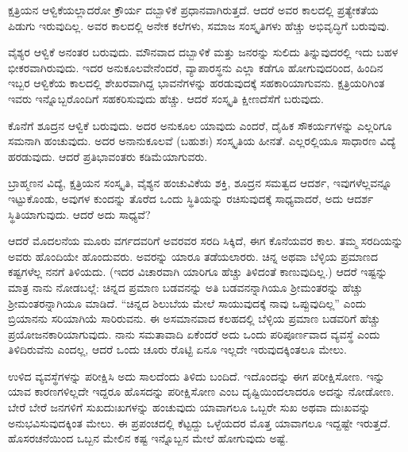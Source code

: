 ಕ್ಷತ್ರಿಯನ ಆಳ್ವಿಕೆಯಲ್ಲಾದರೋ ಕ್ರೌರ್ಯ ದಬ್ಬಾಳಿಕೆ ಪ್ರಧಾನವಾಗಿರುತ್ತದೆ. ಆದರೆ ಅವರ ಕಾಲದಲ್ಲಿ ಪ್ರತ್ಯೇಕತೆಯ ಪಿಡುಗು ಇರುವುದಿಲ್ಲ. ಅವರ ಕಾಲದಲ್ಲಿ ಅನೇಕ ಕಲೆಗಳು, ಸಮಾಜ ಸಂಸ್ಕೃತಿಗಳು ಹೆಚ್ಚು ಅಭಿವೃದ್ಧಿಗೆ ಬರುವುವು.

ವೈಶ್ಯರ ಆಳ್ವಿಕೆ ಅನಂತರ ಬರುವುದು. ಮೌನವಾದ ದಬ್ಬಾಳಿಕೆ ಮತ್ತು ಜನರನ್ನು ಸುಲಿದು ತಿನ್ನುವುದರಲ್ಲಿ ಇದು ಬಹಳ ಭೀಕರವಾಗಿರುವುದು. ಇದರ ಅನುಕೂಲವೇನೆಂದರೆ, ವ್ಯಾಪಾರಸ್ಥನು ಎಲ್ಲಾ ಕಡೆಗೂ ಹೋಗುವುದರಿಂದ, ಹಿಂದಿನ ಇಬ್ಬರ ಆಳ್ವಿಕೆಯ ಕಾಲದಲ್ಲಿ ಶೇಖರವಾಗಿದ್ದ ಭಾವನೆಗಳನ್ನು ಹರಡುವುದಕ್ಕೆ ಸಹಕಾರಿಯಾಗುವನು. ಕ್ಷತ್ರಿಯರಿಗಿಂತ ಇವರು ಇನ್ನೊಬ್ಬರೊಂದಿಗೆ ಸಹಕರಿಸುವುದು ಹೆಚ್ಚು. ಆದರೆ ಸಂಸ್ಕೃತಿ ಕ್ಷೀಣದೆಸೆಗೆ ಬರುವುದು.

ಕೊನೆಗೆ ಶೂದ್ರನ ಆಳ್ವಿಕೆ ಬರುವುದು. ಅದರ ಅನುಕೂಲ ಯಾವುದು ಎಂದರೆ, ದೈಹಿಕ ಸೌಕರ್ಯಗಳನ್ನು ಎಲ್ಲರಿಗೂ ಸಮನಾಗಿ ಹಂಚುವುದು. ಅದರ ಅನಾನುಕೂಲವೆ (ಬಹುಶಃ) ಸಂಸ್ಕೃತಿಯ ಹೀನತೆ. ಎಲ್ಲರಲ್ಲಿಯೂ ಸಾಧಾರಣ ವಿದ್ಯೆ ಹರಡುವುದು. ಆದರೆ ಪ್ರತಿಭಾವಂತರು ಕಡಿಮೆಯಾಗುವರು.

\newpage

ಬ್ರಾಹ್ಮಣನ ವಿದ್ಯೆ, ಕ್ಷತ್ರಿಯನ ಸಂಸ್ಕೃತಿ, ವೈಶ್ಯನ ಹಂಚುವಿಕೆಯ ಶಕ್ತಿ, ಶೂದ್ರನ ಸಮತ್ವದ ಆದರ್ಶ, ಇವುಗಳೆಲ್ಲವನ್ನೂ ಇಟ್ಟುಕೊಂಡು, ಅವುಗಳ ಕುಂದನ್ನು ತೊರೆದ ಒಂದು ಸ್ಥಿತಿಯನ್ನು ರಚಿಸುವುದಕ್ಕೆ ಸಾಧ್ಯವಾದರೆ, ಅದು ಆದರ್ಶ ಸ್ಥಿತಿಯಾಗುವುದು. ಆದರೆ ಅದು ಸಾಧ್ಯವೆ?

\vspace{0.15cm}

ಆದರೆ ಮೊದಲನೆಯ ಮೂರು ವರ್ಗದವರಿಗೆ ಅವರವರ ಸರದಿ ಸಿಕ್ಕಿದೆ, ಈಗ ಕೊನೆಯವರ ಕಾಲ. ತಮ್ಮ ಸರದಿಯನ್ನು ಅವರು ಹೊಂದಿಯೇ ಹೊಂದುವರು. ಅವರನ್ನು ಯಾರೂ ತಡೆಯಲಾರರು. ಚಿನ್ನ ಅಥವಾ ಬೆಳ್ಳಿಯ ಪ್ರಮಾಣದ  ಕಷ್ಟಗಳೆಲ್ಲ ನನಗೆ ತಿಳಿಯದು. (ಇದರ ವಿಚಾರವಾಗಿ ಯಾರಿಗೂ ಹೆಚ್ಚು ತಿಳಿದಂತೆ ಕಾಣುವುದಿಲ್ಲ.) ಆದರೆ ಇಷ್ಟನ್ನು ಮಾತ್ರ ನಾನು ನೋಡಬಲ್ಲೆ: ಚಿನ್ನದ ಪ್ರಮಾಣ ಬಡವನನ್ನು ಅತಿ ಬಡವನನ್ನಾಗಿಯೂ ಶ‍್ರೀಮಂತರನ್ನು ಹೆಚ್ಚು ಶ‍್ರೀಮಂತರನ್ನಾಗಿಯೂ ಮಾಡಿದೆ. “ಚಿನ್ನದ ಶಿಲುಬೆಯ ಮೇಲೆ ಸಾಯುವುದಕ್ಕೆ ನಾವು ಒಪ್ಪುವುದಿಲ್ಲ” ಎಂದು ಬ್ರಿಯಾನನು ಸರಿಯಾಗಿಯೆ ಸಾರಿರುವನು. ಈ ಅಸಮಾನವಾದ ಕಲಹದಲ್ಲಿ ಬೆಳ್ಳಿಯ ಪ್ರಮಾಣ ಬಡವರಿಗೆ ಹೆಚ್ಚು ಪ್ರಯೋಜನಕಾರಿಯಾಗುವುದು. ನಾನು ಸಮತಾವಾದಿ  ಏಕೆಂದರೆ ಅದು ಒಂದು ಪರಿಪೂರ್ಣವಾದ ವ್ಯವಸ್ಥೆ ಎಂದು ತಿಳಿದಿರುವೆನು ಎಂದಲ್ಲ, ಆದರೆ ಒಂದು ಚೂರು ರೊಟ್ಟಿ ಏನೂ ಇಲ್ಲದೇ ಇರುವುದಕ್ಕಿಂತಲೂ ಮೇಲು.

\vspace{0.15cm}

ಉಳಿದ ವ್ಯವಸ್ಥೆಗಳನ್ನು ಪರೀಕ್ಷಿಸಿ ಅದು ಸಾಲದೆಂದು ತಿಳಿದು ಬಂದಿದೆ. ಇದೊಂದನ್ನು ಈಗ ಪರೀಕ್ಷಿಸೋಣ. ಇನ್ನು ಯಾವ ಕಾರಣಗಳಿಲ್ಲದೇ ಇದ್ದರೂ ಹೊಸದನ್ನು ಪರೀಕ್ಷಿಸೋಣ ಎಂಬ ದೃಷ್ಟಿಯಿಂದಲಾದರೂ ಅದನ್ನು ನೋಡೋಣ. ಬೇರೆ ಬೇರೆ ಜನಗಳಿಗೆ ಸುಖದುಃಖಗಳನ್ನು ಹಂಚುವುದು ಯಾವಾಗಲೂ ಒಬ್ಬರೇ ಸುಖ ಅಥವಾ ದುಃಖವನ್ನು ಅನುಭವಿಸುವುದಕ್ಕಿಂತ ಮೇಲು. ಈ ಪ್ರಪಂಚದಲ್ಲಿ ಕೆಟ್ಟದ್ದು ಒಳ್ಳೆಯದರ ಮೊತ್ತ ಯಾವಾಗಲೂ ಇದ್ದಷ್ಟೇ ಇರುತ್ತದೆ. ಹೊಸರಚನೆಯಿಂದ ಒಬ್ಬನ ಮೇಲಿನ ಕಷ್ಟ ಇನ್ನೊಬ್ಬನ ಮೇಲೆ ಹೋಗುವುದು ಅಷ್ಟೆ.

\vspace{0.15cm}


